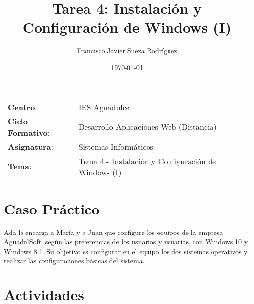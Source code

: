 


\title{
\vspace{10ex}
\normalfont \normalsize
\Huge \textbf{Tarea 4: Instalación y Configuración de Windows (I)}
}
\author{Francisco Javier Sueza Rodríguez}
\date{\normalsize\today}



\maketitle

\thispagestyle{empty}

\vspace{68ex}

\begin{center}
    \begin{tabular}{l l}
        \textbf{Centro}: & IES Aguadulce \\
        \textbf{Ciclo Formativo}: & Desarrollo Aplicaciones Web (Distancia)\\
        \textbf{Asignatura}: & Sistemas Informáticos\\
        \textbf{Tema}: & Tema 4 -  Instalación y Configuración de Windows (I)\\
    \end{tabular}
\end{center}

\newpage

\tableofcontents

\newpage

\listoffigures

\newpage

\section{Caso Práctico}
Ada le encarga a María y a Juan que configure los equipos de la empresa AguadulSoft, según las preferencias de los usuarios y usuarias, con Windows 10 y Windows 8.1. Su objetivo es configurar en el equipo los dos sistemas operativos y realizar las configuraciones básicas del sistema.

\section{Actividades}

\newpage



